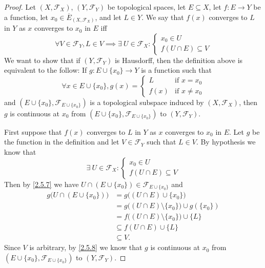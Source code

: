 \begin{proof}
  Let \((X, \mathcal{F}_X)\), \((Y, \mathcal{F}_Y)\) be topological spaces, let \(E \subseteq X\), let \(f : E \to Y\) be a function, let \(x_0 \in \overline{E}_{(X, \mathcal{F}_X)}\), and let \(L \in Y\).
  We say that \(f(x)\) converges to \(L\) in \(Y\) as \(x\) converges to \(x_0\) in \(E\) iff
  \[
    \forall V \in \mathcal{F}_Y, L \in V \implies \exists\ U \in \mathcal{F}_X : \begin{cases}
      x_0 \in U \\
      f(U \cap E) \subseteq V
    \end{cases}
  \]
  We want to show that if \((Y, \mathcal{F}_Y)\) is Hausdorff, then the definition above is equivalent to the follow:
  If \(g : E \cup \{x_0\} \to Y\) is a function such that
  \[
    \forall x \in E \cup \{x_0\}, g(x) = \begin{cases}
      L    & \text{if } x = x_0    \\
      f(x) & \text{if } x \neq x_0
    \end{cases}
  \]
  and \((E \cup \{x_0\}, \mathcal{F}_{E \cup \{x_0\}})\) is a topological subspace induced by \((X, \mathcal{F}_X)\), then \(g\) is continuous at \(x_0\) from \((E \cup \{x_0\}, \mathcal{F}_{E \cup \{x_0\}})\) to \((Y, \mathcal{F}_Y)\).

  First suppose that \(f(x)\) converges to \(L\) in \(Y\) as \(x\) converges to \(x_0\) in \(E\).
  Let \(g\) be the function in the definition and let \(V \in \mathcal{F}_Y\) such that \(L \in V\).
  By hypothesis we know that
  \[
    \exists\ U \in \mathcal{F}_X : \begin{cases}
      x_0 \in U \\
      f(U \cap E) \subseteq V
    \end{cases}
  \]
  Then by \cref{2.5.7} we have \(U \cap (E \cup \{x_0\}) \in \mathcal{F}_{E \cup \{x_0\}}\) and
  \begin{align*}
    g\big(U \cap (E \cup \{x_0\})\big) & = g\big((U \cap E) \cup \{x_0\}\big)                      \\
                                       & = g\big((U \cap E) \setminus \{x_0\}\big) \cup g(\{x_0\}) \\
                                       & = f\big((U \cap E) \setminus \{x_0\}\big) \cup \{L\}      \\
                                       & \subseteq f(U \cap E) \cup \{L\}                          \\
                                       & \subseteq V.
  \end{align*}
  Since \(V\) is arbitrary, by \cref{2.5.8} we know that \(g\) is continuous at \(x_0\) from \((E \cup \{x_0\}, \mathcal{F}_{E \cup \{x_0\}})\) to \((Y, \mathcal{F}_Y)\).


\end{proof}
